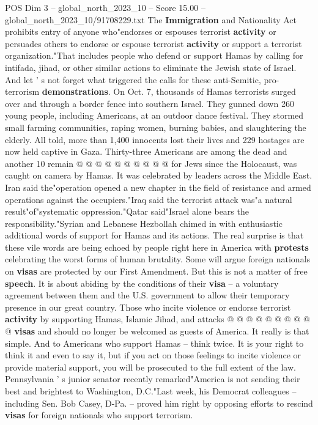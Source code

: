 \begin{textsample}{POS Dim 3 – global\_north\_2023\_10 – Score 15.00 – global\_north\_2023\_10/91708229.txt}
The \textbf{Immigration} and Nationality Act prohibits entry of anyone who"endorses or espouses terrorist \textbf{activity} or persuades others to endorse or espouse terrorist \textbf{activity} or support a terrorist organization."That includes people who defend or support Hamas by calling for intifada, jihad, or other similar actions to eliminate the Jewish state of Israel.
And let ' s not forget what triggered the calls for these anti-Semitic, pro-terrorism \textbf{demonstrations}.
On Oct. 7, thousands of Hamas terrorists surged over and through a border fence into southern Israel.
They gunned down 260 young people, including Americans, at an outdoor dance festival.
They stormed small farming communities, raping women, burning babies, and slaughtering the elderly.
All told, more than 1,400 innocents lost their lives and 229 hostages are now held captive in Gaza.
Thirty-three Americans are among the dead and another 10 remain @ @ @ @ @ @ @ @ @ @ for Jews since the Holocaust, was caught on camera by Hamas.
It was celebrated by leaders across the Middle East.
Iran said the"operation opened a new chapter in the field of resistance and armed operations against the occupiers."Iraq said the terrorist attack was"a natural result"of"systematic oppression."Qatar said"Israel alone bears the responsibility."Syrian and Lebanese Hezbollah chimed in with enthusiastic additional words of support for Hamas and its actions.
The real surprise is that these vile words are being echoed by people right here in America with \textbf{protests} celebrating the worst forms of human brutality.
Some will argue foreign nationals on \textbf{visas} are protected by our First Amendment.
But this is not a matter of free \textbf{speech}.
It is about abiding by the conditions of their \textbf{visa} -- a voluntary agreement between them and the U.S. government to allow their temporary presence in our great country.
Those who incite violence or endorse terrorist \textbf{activity} by supporting Hamas, Islamic Jihad, and attacks @ @ @ @ @ @ @ @ @ @ \textbf{visas} and should no longer be welcomed as guests of America.
It really is that simple.
And to Americans who support Hamas -- think twice.
It is your right to think it and even to say it, but if you act on those feelings to incite violence or provide material support, you will be prosecuted to the full extent of the law.
Pennsylvania ' s junior senator recently remarked"America is not sending their best and brightest to Washington, D.C."Last week, his Democrat colleagues -- including Sen.
Bob Casey, D-Pa. -- proved him right by opposing efforts to rescind \textbf{visas} for foreign nationals who support terrorism.

\end{textsample}
